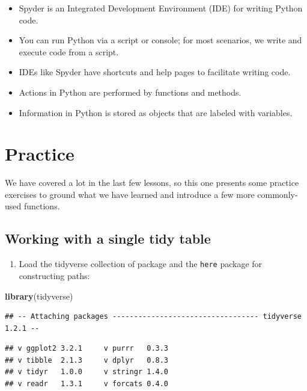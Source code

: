 \documentclass[]{Nemilov}
\newenvironment{Shaded}{\begin{snugshade}}{\end{snugshade}}
\newcommand{\KeywordTok}[1]{\textcolor[rgb]{0.13,0.29,0.53}{\textbf{#1}}}
\newcommand{\NormalTok}[1]{#1}
\providecommand{\tightlist}{%
  \setlength{\itemsep}{0pt}\setlength{\parskip}{0pt}}
\begin{document}
\begin{itemize}
\tightlist
\item
  Spyder is an Integrated Development Environment (IDE) for writing Python code.
\item
  You can run Python via a script or console; for most scenarios, we write and execute code from a script.
\item
  IDEs like Spyder have shortcuts and help pages to facilitate writing code.
\item
  Actions in Python are performed by functions and methods.
\item
  Information in Python is stored as objects that are labeled with variables.
\end{itemize}

\hypertarget{practice}{%
\chapter{Practice}\label{practice}}

We have covered a lot in the last few lessons,
so this one presents some practice exercises to ground what we have learned
and introduce a few more commonly-used functions.

\hypertarget{working-with-a-single-tidy-table}{%
\section{Working with a single tidy table}\label{working-with-a-single-tidy-table}}

\begin{enumerate}
\def\labelenumi{\arabic{enumi}.}
\tightlist
\item
  Load the tidyverse collection of package and the \texttt{here} package for constructing paths:
\end{enumerate}

\begin{Shaded}
\begin{Highlighting}[]
\KeywordTok{library}\NormalTok{(tidyverse)}
\end{Highlighting}
\end{Shaded}

\begin{verbatim}
## -- Attaching packages ---------------------------------- tidyverse 1.2.1 --
\end{verbatim}

\begin{verbatim}
## v ggplot2 3.2.1     v purrr   0.3.3
## v tibble  2.1.3     v dplyr   0.8.3
## v tidyr   1.0.0     v stringr 1.4.0
## v readr   1.3.1     v forcats 0.4.0
\end{verbatim}
\end{document}

